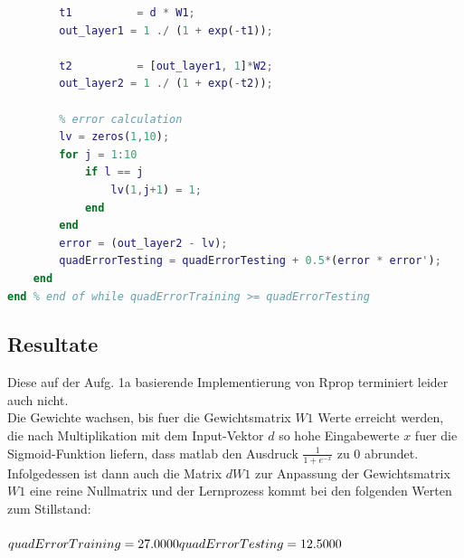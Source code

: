 \documentclass[12pt]{article}
\begin{document}
\begin{lstlisting}[language=Matlab]
        % forward pass
        t1          = d * W1;
        out_layer1 = 1 ./ (1 + exp(-t1));
        
        t2          = [out_layer1, 1]*W2;
        out_layer2 = 1 ./ (1 + exp(-t2));
        
        % error calculation
        lv = zeros(1,10);
        for j = 1:10
            if l == j
                lv(1,j+1) = 1;
            end
        end
        error = (out_layer2 - lv);
        quadErrorTesting = quadErrorTesting + 0.5*(error * error');
    end
end % end of while quadErrorTraining >= quadErrorTesting
\end{lstlisting}

\subsection{Resultate}
Diese auf der Aufg. 1a basierende Implementierung von Rprop terminiert leider auch nicht.\\
Die Gewichte wachsen, bis fuer die Gewichtsmatrix $W1$ Werte erreicht werden, die nach Multiplikation mit dem Input-Vektor $d$ so hohe Eingabewerte $x$ fuer die Sigmoid-Funktion liefern, dass matlab den Ausdruck $\frac{1}{1 + e^{-x}}$ zu $0$ abrundet. Infolgedessen ist dann auch die Matrix $dW1$ zur Anpassung der Gewichtsmatrix $W1$ eine reine Nullmatrix und der Lernprozess kommt bei den folgenden Werten zum Stillstand:\\
\\
$quadErrorTraining = 27.0000\\
quadErrorTesting = 12.5000$
\end{document}
